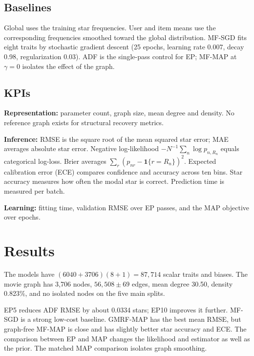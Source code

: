 \documentclass[11pt,a4paper]{article}
\begin{document}
\subsection{Baselines}
Global uses the training star frequencies. User and item means use the
corresponding frequencies smoothed toward the global distribution. MF-SGD
fits eight traits by stochastic gradient descent (25 epochs, learning
rate 0.007, decay 0.98, regularization 0.03). ADF is the single-pass
control for EP; MF-MAP at $\gamma=0$ isolates the effect of the graph.

\subsection{KPIs}
\textbf{Representation:} parameter count, graph size, mean degree and
density. No reference graph exists for structural recovery metrics.

\textbf{Inference:} RMSE is the square root of the mean squared star error;
MAE averages absolute star error. Negative log-likelihood
$-N^{-1}\sum_n\log p_{n,R_n}$ equals categorical log-loss. Brier averages
$\sum_r(p_{nr}-\mathbf1\{r=R_n\})^2$. Expected calibration error (ECE)
compares confidence and accuracy across ten bins. Star accuracy measures
how often the modal star is correct. Prediction time is measured per batch.

\textbf{Learning:} fitting time, validation RMSE over EP passes, and the
MAP objective over epochs.

\section{Results}
The models have $(6040+3706)(8+1)=87,714$ scalar traits and biases.
The movie graph has 3,706 nodes, $56,508\pm69$ edges, mean degree 30.50,
density 0.823\%, and no isolated nodes on the five main splits.

\begin{table}[H]\centering\footnotesize

\caption{MovieLens 1M test results, mean $\pm$ sample SD across five splits.}
\end{table}
EP5 reduces ADF RMSE by about 0.0334 stars; EP10 improves it further.
MF-SGD is a strong low-cost baseline. GMRF-MAP has the best mean RMSE,
but graph-free MF-MAP is close and has slightly better star accuracy and
ECE. The comparison between EP and MAP changes the likelihood and
estimator as well as the prior. The matched MAP comparison isolates
graph smoothing.
\end{document}
